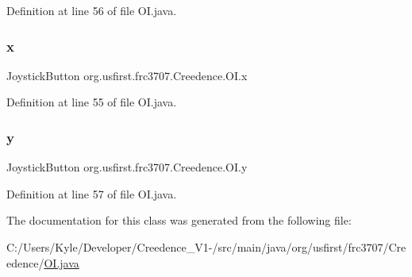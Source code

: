 Definition at line 56 of file O\+I.\+java.

\mbox{\label{classorg_1_1usfirst_1_1frc3707_1_1_creedence_1_1_o_i_a5f154c5a9d35253767a1f31be8988640}} 
\subsubsection{\texorpdfstring{x}{x}}
{\footnotesize\ttfamily Joystick\+Button org.\+usfirst.\+frc3707.\+Creedence.\+O\+I.\+x}



Definition at line 55 of file O\+I.\+java.

\mbox{\label{classorg_1_1usfirst_1_1frc3707_1_1_creedence_1_1_o_i_a2ecf04b607973b5eb138464fafd001d7}} 
\subsubsection{\texorpdfstring{y}{y}}
{\footnotesize\ttfamily Joystick\+Button org.\+usfirst.\+frc3707.\+Creedence.\+O\+I.\+y}



Definition at line 57 of file O\+I.\+java.



The documentation for this class was generated from the following file\+:\begin{DoxyCompactItemize}
\item 
C\+:/\+Users/\+Kyle/\+Developer/\+Creedence\+\_\+\+V1-\//src/main/java/org/usfirst/frc3707/\+Creedence/\mbox{\hyperlink{_o_i_8java}{O\+I.\+java}}\end{DoxyCompactItemize}
